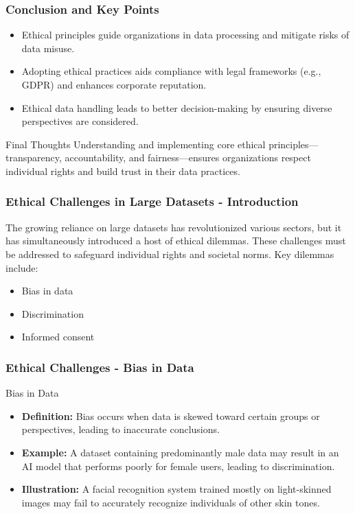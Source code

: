 \documentclass[aspectratio=169]{beamer}
\begin{document}
\begin{frame}[fragile]
  \frametitle{Conclusion and Key Points}
  \begin{itemize}
    \item Ethical principles guide organizations in data processing and mitigate risks of data misuse.
    \item Adopting ethical practices aids compliance with legal frameworks (e.g., GDPR) and enhances corporate reputation.
    \item Ethical data handling leads to better decision-making by ensuring diverse perspectives are considered.
  \end{itemize}
  
  \begin{block}{Final Thoughts}
    Understanding and implementing core ethical principles—transparency, accountability, and fairness—ensures organizations respect individual rights and build trust in their data practices.
  \end{block}
\end{frame}

\begin{frame}[fragile]
    \frametitle{Ethical Challenges in Large Datasets - Introduction}
    The growing reliance on large datasets has revolutionized various sectors, 
    but it has simultaneously introduced a host of ethical dilemmas. 
    These challenges must be addressed to safeguard individual rights and societal norms. 
    Key dilemmas include:
    \begin{itemize}
        \item Bias in data
        \item Discrimination
        \item Informed consent
    \end{itemize}
\end{frame}

\begin{frame}[fragile]
    \frametitle{Ethical Challenges - Bias in Data}
    \begin{block}{Bias in Data}
        \begin{itemize}
            \item \textbf{Definition:} Bias occurs when data is skewed toward certain groups or perspectives, 
            leading to inaccurate conclusions.
            \item \textbf{Example:} A dataset containing predominantly male data may result in an AI model 
            that performs poorly for female users, leading to discrimination.
            \item \textbf{Illustration:} A facial recognition system trained mostly on light-skinned images may 
            fail to accurately recognize individuals of other skin tones.
        \end{itemize}
    \end{block}
\end{frame}
\end{document}
